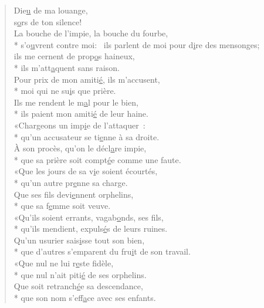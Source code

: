 
\begin{verse}
Die\underline{u} de ma louange, \\
s\underline{o}rs de ton silence! \\

La bouche de l’impie, la bouche du fourbe, \\*
s’o\underline{u}vrent contre moi:~\psalmstar
ils parlent de moi pour d\underline{i}re des mensonges; \\
ils me cernent de prop\underline{o}s haineux, \\*
ils m’att\underline{a}quent sans raison. \\

Pour prix de mon amiti\underline{é}, ils m’accusent, \\*
moi qui ne su\underline{i}s que prière. \\
Ils me rendent le m\underline{a}l pour le bien, \\*
ils paient mon amiti\underline{é} de leur haine. \\

«Chargeons un imp\underline{i}e de l’attaquer : \\*
qu’un accusateur se ti\underline{e}nne à sa droite. \\
À son procès, qu’on le décl\underline{a}re impie, \\*
que sa prière soit compt\underline{é}e comme une faute. \\

«Que les jours de sa v\underline{i}e soient écourtés, \\*
qu’un autre pr\underline{e}nne sa charge. \\
Que ses fils devi\underline{e}nnent orphelins, \\*
que sa f\underline{e}mme soit veuve. \\

«Qu’ils soient errants, vagab\underline{o}nds, ses fils, \\*
qu’ils mendient, expuls\underline{é}s de leurs ruines. \\
Qu’un usurier sais\underline{i}sse tout son bien, \\*
que d’autres s’emparent du fru\underline{i}t de son travail. \\

«Que nul ne lui r\underline{e}ste fidèle, \\*
que nul n’ait piti\underline{é} de ses orphelins. \\
Que soit retranch\underline{é}e sa descendance, \\*
que son nom s’eff\underline{a}ce avec ses enfants. \\


\end{verse}

